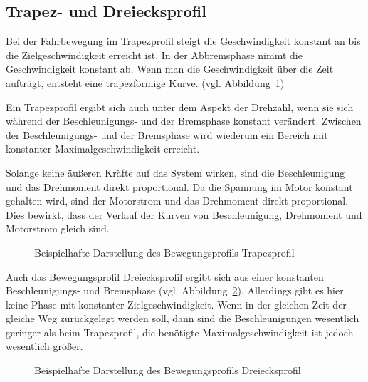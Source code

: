 \subsection{Trapez- und Dreiecksprofil} \label{cha:Trapez und Dreiecksprofil}


Bei der Fahrbewegung im Trapezprofil steigt die Geschwindigkeit konstant an bis die Zielgeschwindigkeit erreicht ist. In der Abbremsphase nimmt die Geschwindigkeit konstant ab. Wenn man die Geschwindigkeit über die Zeit aufträgt, entsteht eine trapezförmige Kurve. (vgl. Abbildung~\ref{fig:Trapezprofil})  

Ein Trapezprofil ergibt sich auch unter dem Aspekt der Drehzahl, wenn sie sich während der Beschleunigungs- und der Bremsphase konstant verändert. \cite{Kiel2007a} Zwischen der Beschleunigungs- und der Bremsphase wird wiederum ein Bereich mit konstanter Maximalgeschwindigkeit erreicht.

Solange keine äußeren Kräfte auf das System wirken, sind die Beschleunigung und das Drehmoment direkt proportional. Da die Spannung im Motor konstant gehalten wird, sind der Motorstrom und das Drehmoment direkt proportional. Dies bewirkt, dass der Verlauf der Kurven von Beschleunigung, Drehmoment und Motorstrom gleich sind.





\begin{figure}[h]

\caption{Beispielhafte Darstellung des Bewegungsprofils Trapezprofil}
\label{fig:Trapezprofil}
\end{figure}


Auch das Bewegungsprofil Dreiecksprofil ergibt sich aus einer konstanten Beschleunigungs- und Bremsphase (vgl. Abbildung~\ref{fig:Dreiecksprofil}). Allerdings gibt es hier keine Phase mit konstanter Zielgeschwindigkeit. Wenn in der gleichen Zeit der gleiche Weg zurückgelegt werden soll, dann sind die Beschleunigungen wesentlich geringer als beim Trapezprofil, die benötigte Maximalgeschwindigkeit ist jedoch wesentlich größer.

\begin{figure}[h]

\caption{Beispielhafte Darstellung des Bewegungsprofils Dreiecksprofil}
\label{fig:Dreiecksprofil}
\end{figure}


\newpage




